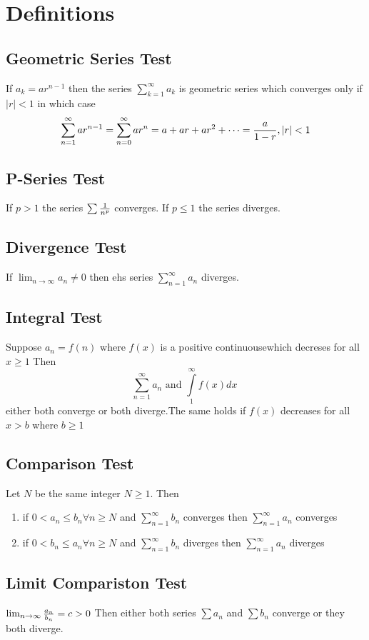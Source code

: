 \documentclass[12pt]{article}
\begin{document}
\section{Definitions}
\label{sec:def}

\subsection{Geometric Series Test}
If $a_k = a r^{n-1}$ then the series $\sum_{k=1}^{\infty}a_k$ is geometric series which converges only if $|r|<1$ in which case
\[
\sum_{n=1}^{\infty}ar^{n-1}=\sum_{n=0}^{\infty}ar^n = a + ar + ar^2 + \dots   = {a \over 1-r}, |r|<1
\]

\subsection{P-Series Test}
If $p > 1$ the series $\sum{1 \over n^{p}}$ converges. If $p \leq 1$ the series diverges.

\subsection{Divergence Test}
If $\lim_{n \to \infty} a_n \neq 0$ then ehs series $\sum_{n=1}^{\infty} a_n$ diverges.

\subsection{Integral Test}
Suppose $a_n = f(n)$ where $f(x)$ is a positive continuousewhich decreses for all $x \geq 1$ Then
\[
\sum_{n=1}^{\infty} a_n \text{ and } \int\limits_1^\infty f(x) dx
\
\]
either both converge or both diverge.The same holds if $f(x)$ decreases for all $x > b$ where $b \geq 1$

\subsection{Comparison Test} 
Let $N$ be the same integer $N \geq 1$. Then
\begin{enumerate}
\item if $0 < a_n \leq b_n \forall n \geq N$ and $\sum_{n=1}^{\infty} b_n$ converges then $\sum_{n=1}^{\infty} a_n$ converges
\item if $0 < b_n \leq a_n \forall n \geq N$ and $\sum_{n=1}^{\infty} b_n$ diverges then $\sum_{n=1}^{\infty} a_n$ diverges
\end{enumerate}

\subsection{Limit Compariston Test}
$\lim_{n \to \infty} {a_n \over b_n} = c > 0$
Then either both series $\sum a_n$ and $\sum b_n$ converge or they both diverge.
\end{document}
